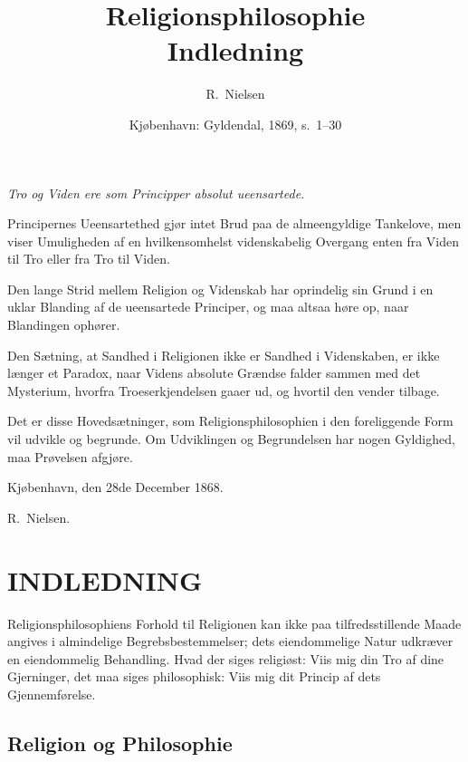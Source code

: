 \documentclass[12pt,a4paper]{article}
\title{\textbf{Religionsphilosophie}\\[6pt]
  \large Indledning}
\author{R.\ Nielsen}
\date{Kjøbenhavn: Gyldendal, 1869, s.\ 1--30}
\begin{document}
\maketitle
\thispagestyle{fancy}

\bigskip

\begin{center}
\itshape
Tro og Viden ere som Principper absolut ueensartede.

\smallskip

Principernes Ueensartethed gjør intet Brud paa de
almeengyldige Tankelove, men viser Umuligheden af en
hvilkensomhelst videnskabelig Overgang enten fra Viden
til Tro eller fra Tro til Viden.

\smallskip

Den lange Strid mellem Religion og Videnskab har
oprindelig sin Grund i en uklar Blanding af de ueensartede
Principer, og maa altsaa høre op, naar Blandingen ophører.

\smallskip

Den Sætning, at Sandhed i Religionen ikke er Sandhed i
Videnskaben, er ikke længer et Paradox, naar Videns absolute
Grændse falder sammen med det Mysterium, hvorfra
Troeserkjendelsen gaaer ud, og hvortil den vender tilbage.

\smallskip

Det er disse Hovedsætninger, som Religionsphilosophien i
den foreliggende Form vil udvikle og begrunde. Om
Udviklingen og Begrundelsen har nogen Gyldighed, maa
Prøvelsen afgjøre.

\bigskip
Kjøbenhavn, den 28de December 1868.

R.\ Nielsen.
\end{center}

\bigskip\bigskip

\section*{INDLEDNING}

Religionsphilosophiens Forhold til Religionen kan ikke paa
tilfredsstillende Maade angives i almindelige
Begrebsbestemmelser; dets eiendommelige Natur udkræver en
eiendommelig Behandling. Hvad der siges religiøst: Viis mig
din Tro af dine Gjerninger, det maa siges philosophisk: Viis
mig dit Princip af dets Gjennemførelse.

\subsection*{Religion og Philosophie}
\end{document}
